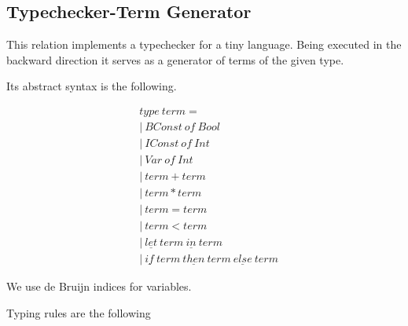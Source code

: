 \subsection{Typechecker-Term Generator}

This relation implements a typechecker for a tiny language. Being executed in the backward direction it serves as a generator of terms of the given type.

Its abstract syntax is the following.


\begin{align*}
  &type \ term = \\
  &| \ BConst \ of \ Bool \\
  &| \ IConst \ of \ Int \\
  &| \ Var \ of \ Int \\
  &| \ term + term \\
  &| \ term * term \\
  &| \ term = term \\
  &| \ term < term \\
  &| \ \underline{let} \ term \ \underline{in} \ term \\
  &| \ \underline{if} \ term \ \underline{then} \ term \ \underline{else} \ term
\end{align*}

We use de Bruijn indices for variables.

Typing rules are the following

